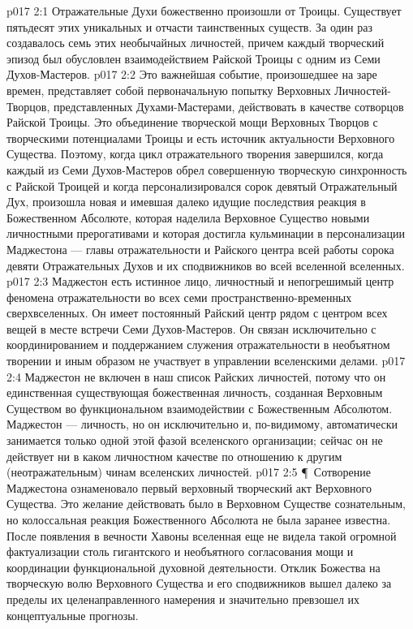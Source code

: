 \vs p017 2:1 Отражательные Духи божественно произошли от Троицы. Существует пятьдесят этих уникальных и отчасти таинственных существ. За один раз создавалось семь этих необычайных личностей, причем каждый творческий эпизод был обусловлен взаимодействием Райской Троицы с одним из Семи Духов\hyp{}Мастеров.
\vs p017 2:2 Это важнейшая событие, произошедшее на заре времен, представляет собой первоначальную попытку Верховных Личностей\hyp{}Творцов, представленных Духами\hyp{}Мастерами, действовать в качестве сотворцов Райской Троицы. Это объединение творческой мощи Верховных Творцов с творческими потенциалами Троицы и есть источник актуальности Верховного Существа. Поэтому, когда цикл отражательного творения завершился, когда каждый из Семи Духов\hyp{}Мастеров обрел совершенную творческую синхронность с Райской Троицей и когда персонализировался сорок девятый Отражательный Дух, произошла новая и имевшая далеко идущие последствия реакция в Божественном Абсолюте, которая наделила Верховное Существо новыми личностными прерогативами и которая достигла кульминации в персонализации Маджестона --- главы отражательности и Райского центра всей работы сорока девяти Отражательных Духов и их сподвижников во всей вселенной вселенных.
\vs p017 2:3 Маджестон есть истинное лицо, личностный и непогрешимый центр феномена отражательности во всех семи пространственно\hyp{}временных сверхвселенных. Он имеет постоянный Райский центр рядом с центром всех вещей в месте встречи Семи Духов\hyp{}Мастеров. Он связан исключительно с координированием и поддержанием служения отражательности в необъятном творении и иным образом не участвует в управлении вселенскими делами.
\vs p017 2:4 Маджестон не включен в наш список Райских личностей, потому что он единственная существующая божественная личность, созданная Верховным Существом во функциональном взаимодействии с Божественным Абсолютом. Маджестон --- личность, но он исключительно и, по\hyp{}видимому, автоматически занимается только одной этой фазой вселенского организации; сейчас он не действует ни в каком личностном качестве по отношению к другим (неотражательным) чинам вселенских личностей.
\vs p017 2:5 \P\ Сотворение Маджестона ознаменовало первый верховный творческий акт Верховного Существа. Это желание действовать было в Верховном Существе сознательным, но колоссальная реакция Божественного Абсолюта не была заранее известна. После появления в вечности Хавоны вселенная еще не видела такой огромной фактуализации столь гигантского и необъятного согласования мощи и координации функциональной духовной деятельности. Отклик Божества на творческую волю Верховного Существа и его сподвижников вышел далеко за пределы их целенаправленного намерения и значительно превзошел их концептуальные прогнозы.
